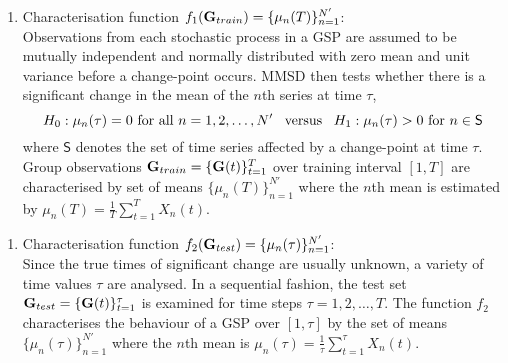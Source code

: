 \begin{enumerate}[1.]
\item Characterisation function $f_1({\bf G}_{train})=\{\mu_n(T)\}_{n=1}^{N'}$: \\ 
Observations from each stochastic process in a GSP  are assumed to be mutually independent and normally distributed with zero mean and unit variance before a change-point occurs. MMSD then tests whether there is a significant change  in the mean of the $n$th series at time $\tau$, 
\[ H_0: \mu_n(\tau)= 0  \mbox{ for all } n=1,2,\dots, N' \mbox{ \, versus \,  } H_1: \mu_n(\tau) > 0 \mbox{ for } n \in \mathsf{S}  \]  
 where $\mathsf{S}$  denotes the set of time series affected by a change-point at time $\tau$.  
   Group observations ${\bf G}_{train} =\{ {\bf G} ({t}) \}_{t=1}^T$ over  training interval  $[1,T] $ are characterised by  set of means  $\{\mu_n(T)\}_{n=1}^{N'}$ where   
the $n$th mean is estimated by  
$   \mu_n(T) =\frac{1}{T} \sum_{t=1}^T   X_{n} (t) $. 
\end{enumerate}
%
\begin{enumerate}[2.]
\item Characterisation function $f_2({\bf G}_{test}) = \{\mu_n(\tau) \}_{n=1}^{N'}$: \\ 
Since the true times of significant change are usually unknown, a variety of time values  $\tau$ are analysed. In a sequential fashion,  the test set ${\bf G}_{test} =\{ {\bf G} ({t}) \}_{t=1}^\tau$ is examined for time steps  $\tau=1,2,\dots,T$. The function $f_2$ characterises the behaviour of a GSP over $[1,\tau]$ by the set of means  $\{\mu_n(\tau)\}_{n=1}^{N'}$ where  the $n$th mean is  
$  \mu_n(\tau) =\frac{1}{\tau} \sum_{t=1}^\tau   X_{ n}(t) $. 
\end{enumerate}
%

